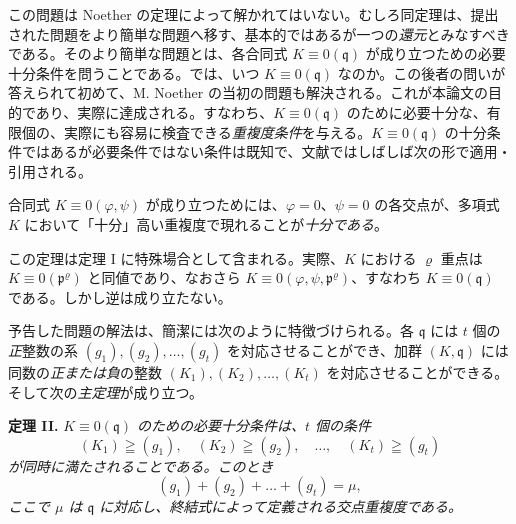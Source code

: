 この問題は Noether の定理によって解かれてはいない。むしろ同定理は、提出された問題をより簡単な問題へ移す、基本的ではあるが一つの\emph{還元}とみなすべきである。そのより簡単な問題とは、各合同式 \(K\equiv0(\mathfrak{q})\) が成り立つための必要十分条件を問うことである。では、いつ \(K\equiv0(\mathfrak{q})\) なのか。この後者の問いが答えられて初めて、M. Noether の当初の問題も解決される。これが本論文の目的であり、実際に達成される。すなわち、\(K\equiv0(\mathfrak{q})\) のために必要十分な、有限個の、実際にも容易に検査できる\emph{重複度条件}を与える。\(K\equiv0(\mathfrak{q})\) の十分条件ではあるが必要条件ではない条件は既知で、文献ではしばしば次の形で適用・引用される。

合同式 \(K\equiv0(\varphi,\psi)\) が成り立つためには、\(\varphi=0\)、\(\psi=0\) の各交点が、多項式 \(K\) において「十分」高い重複度で現れることが\emph{十分である}。

この定理は定理 I に特殊場合として含まれる。実際、\(K\) における \(\varrho\) 重点は \(K\equiv0(\mathfrak{p}^\varrho)\) と同値であり、なおさら \(K\equiv0(\varphi,\psi,\mathfrak{p}^\varrho)\)、すなわち \(K\equiv0(\mathfrak{q})\) である。しかし逆は成り立たない。

予告した問題の解法は、簡潔には次のように特徴づけられる。各 \(\mathfrak{q}\) には \(t\) 個の\emph{正}整数の系 \((g_1),(g_2),\ldots,(g_t)\) を対応させることができ、加群 \((K,\mathfrak{q})\) には同数の\emph{正または負}の整数 \((K_1),(K_2),\ldots,(K_t)\) を対応させることができる。そして次の\emph{主定理}が成り立つ。

\textbf{定理 II.} \emph{\(K\equiv0(\mathfrak{q})\) のための必要十分条件は、\(t\) 個の条件}
\[
(K_1)\geqq(g_1),\quad (K_2)\geqq(g_2),\quad \ldots,\quad (K_t)\geqq(g_t)
\]
\emph{が同時に満たされることである。このとき}
\[
(g_1)+(g_2)+\ldots+(g_t)=\mu,
\]
\emph{ここで \(\mu\) は \(\mathfrak{q}\) に対応し、終結式によって定義される交点重複度である。}

